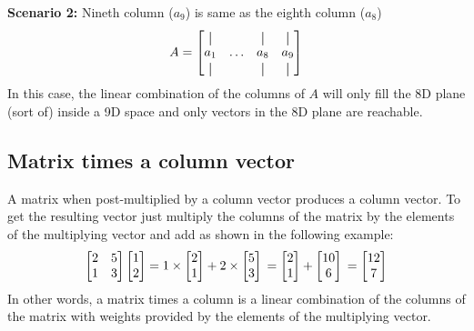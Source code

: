 \documentclass[../main.tex]{subfiles}
\begin{document}
\textbf{Scenario 2:} Nineth column (\( a_{9} \)) is same as the eighth column (\( a_{8} \))
\[
    A
    =
    \begin{bmatrix}
        \vertbar &        & \vertbar & \vertbar \\
        a_{1}    & \ldots & a_{8}    & a_{9}    \\
        \vertbar &        & \vertbar & \vertbar \\
    \end{bmatrix}
\]
In this case, the linear combination of the columns of $A$ will only fill the 8D plane (sort of) inside a 9D space and only vectors in the 8D plane are reachable.

\subsection{Matrix times a column vector}
A matrix when post-multiplied by a column vector produces a column vector. To get the resulting vector just multiply the columns of the matrix by the elements of the multiplying vector and add as shown in the following example:
\[
    \begin{bmatrix}
        2 & 5 \\
        1 & 3
    \end{bmatrix}
    \begin{bmatrix}
        1 \\
        2
    \end{bmatrix}
    =
    1 \times
    \begin{bmatrix}
        2 \\
        1
    \end{bmatrix}
    +
    2 \times
    \begin{bmatrix}
        5 \\
        3
    \end{bmatrix} \\
    =
    \begin{bmatrix}
        2 \\
        1
    \end{bmatrix}
    +
    \begin{bmatrix}
        10 \\
        6
    \end{bmatrix}\\
    =
    \begin{bmatrix}
        12 \\
        7
    \end{bmatrix}
\]
In other words, a matrix times a column is a linear combination of the columns of the matrix with weights provided by the elements of the multiplying vector.
\end{document}

